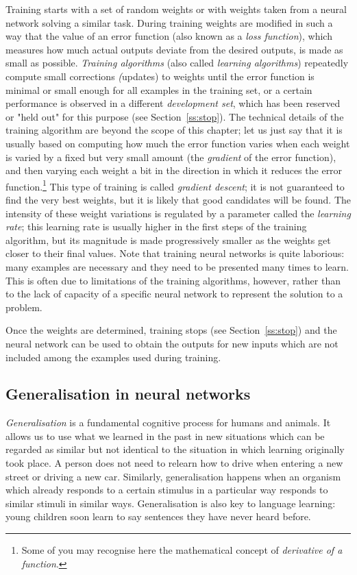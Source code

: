 \documentclass[output=paper,colorlinks,citecolor=brown]{langscibook}
\begin{document}
Training starts with a set of random weights or with weights taken from a neural network solving a similar task. During training weights are modified in such a way that the value of an error function (also known as a \emph{loss function}), which measures how much actual outputs deviate from the desired outputs, is made as small as possible. \emph{Training algorithms} (also called \emph{learning algorithms}) repeatedly compute small corrections \emph(updates) to weights until the error function is minimal or small enough for all examples in the training set, or a certain performance is observed in a different \emph{development set}, which has been reserved or "held out" for this purpose (see Section~\ref{ss:stop}). 
The technical details of the training algorithm are beyond the scope of this chapter; let us just say that it is usually based on computing how much the error function varies when each weight is varied by a fixed but very small amount (the \emph{gradient} of the error function), and then varying each weight a bit in the direction in which it reduces the error function.\footnote{Some of you may recognise here the mathematical concept of \emph{derivative of a function}.} 
This type of training is called \emph{gradient descent}; it is not guaranteed to find the very best weights, but it is likely that good candidates will be found.
The intensity of these weight variations is regulated by a parameter called the \emph{learning rate}; this learning rate is usually higher in the first steps of the training algorithm, but its magnitude is made progressively smaller as the weights get closer to their final values. Note that training neural networks is quite laborious: many examples are necessary and they need to be presented many times to learn. This is often due to limitations of the training algorithms, however, rather than to the lack of capacity of a specific neural network to represent the solution to a problem. 

Once the weights are determined, training stops (see Section~\ref{ss:stop}) and the neural network can be used to obtain the outputs for new inputs which are not included among the examples used during training.


\subsection{Generalisation in neural networks}

\emph{Generalisation} is a fundamental cognitive process for humans and animals. It allows us to use what we learned in the past in new situations which can be regarded as similar but not identical to the situation in which learning originally took place. A person does not need to relearn how to drive when entering a new street or driving a new car. Similarly, generalisation happens when an organism which already responds to a certain stimulus in a particular way responds to similar stimuli in similar ways. Generalisation is also key to language learning: young children soon learn to say sentences they have never heard before.
\end{document}
